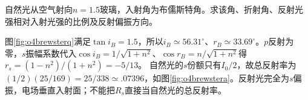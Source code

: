 \begin{exercise}\label{ex:o4brewsternumerical}
自然光从空气射向$n=1.5$玻璃，入射角为布儒斯特角。求该角、折射角、反射光强相对入射光强的比例及反射偏振方向。
\end{exercise}
\begin{solution}
图\ref{fig:o4brewsterq}满足$\tan i_B=1.5$，所以$i_B\simeq56.31^\circ$、$r_B\simeq33.69^\circ$。$p$反射为零，$s$振幅系数代入$\cos i_B=1/\sqrt{1+n^2}$、$\cos r_B=n/\sqrt{1+n^2}$得$r_s=(1-n^2)/(1+n^2)=-5/13$。
自然光的$s$份额只有$I_0/2$，故总反射率为$(1/2)(25/169)=25/338\simeq.07396$，如图\ref{fig:o4brewstera}。反射光完全为$s$偏振，电场垂直入射面；不能把$R_s$直接当自然光的总反射率。
\end{solution}

